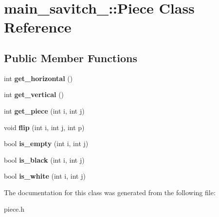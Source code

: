 \hypertarget{classmain__savitch__14_1_1Piece}{}\section{main\+\_\+savitch\+\_\+:\+:Piece Class Reference}
\label{classmain__savitch__14_1_1Piece}
\subsection*{Public Member Functions}
\begin{DoxyCompactItemize}
\item 
int {\bfseries get\+\_\+horizontal} ()\hypertarget{classmain__savitch__14_1_1Piece_adb5a5097b1a3a0750cfb052bd3a0215d}{}\label{classmain__savitch__14_1_1Piece_adb5a5097b1a3a0750cfb052bd3a0215d}

\item 
int {\bfseries get\+\_\+vertical} ()\hypertarget{classmain__savitch__14_1_1Piece_a3d1aee3f481e21ebcf937b740ef2cdea}{}\label{classmain__savitch__14_1_1Piece_a3d1aee3f481e21ebcf937b740ef2cdea}

\item 
int {\bfseries get\+\_\+piece} (int i, int j)\hypertarget{classmain__savitch__14_1_1Piece_a616d9f83e798305fb2eab2de39a9b754}{}\label{classmain__savitch__14_1_1Piece_a616d9f83e798305fb2eab2de39a9b754}

\item 
void {\bfseries flip} (int i, int j, int p)\hypertarget{classmain__savitch__14_1_1Piece_a5bc38e6d888b011a75a44db64dee5dc3}{}\label{classmain__savitch__14_1_1Piece_a5bc38e6d888b011a75a44db64dee5dc3}

\item 
bool {\bfseries is\+\_\+empty} (int i, int j)\hypertarget{classmain__savitch__14_1_1Piece_a7c0a48c1f5990600e4559dbb7df275a4}{}\label{classmain__savitch__14_1_1Piece_a7c0a48c1f5990600e4559dbb7df275a4}

\item 
bool {\bfseries is\+\_\+black} (int i, int j)\hypertarget{classmain__savitch__14_1_1Piece_a0c185e81febae5e7267b04a9e4b759a9}{}\label{classmain__savitch__14_1_1Piece_a0c185e81febae5e7267b04a9e4b759a9}

\item 
bool {\bfseries is\+\_\+white} (int i, int j)\hypertarget{classmain__savitch__14_1_1Piece_a30f37028531752fe3777793e4d7f9025}{}\label{classmain__savitch__14_1_1Piece_a30f37028531752fe3777793e4d7f9025}

\end{DoxyCompactItemize}


The documentation for this class was generated from the following file\+:\begin{DoxyCompactItemize}
\item 
piece.\+h\end{DoxyCompactItemize}
